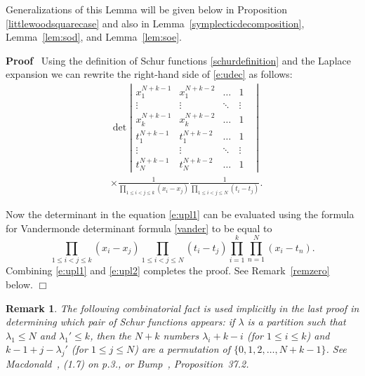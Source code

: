 \documentclass[11pt]{amsart}
\renewenvironment{proof}{
\noindent\textbf{Proof}\ }{\hspace*{\fill}
\begin{math}\Box\end{math}\medskip}
\newtheorem{varremark}{Remark}
\newenvironment{remark}{\begin{varremark}\em}{\em\end{varremark}}
\begin{document}
Generalizations of this Lemma will be given below in Proposition
\ref{littlewoodsquarecase} and also in
Lemma~\ref{symplecticdecomposition}, Lemma~\ref{lem:sod}, and
Lemma~\ref{lem:soe}.

\medbreak
\begin{proof}
Using the definition of Schur functions \eqref{schurdefinition}
and the Laplace expansion we can rewrite the right-hand side of
\eqref{e:udec} as follows:
\begin{equation} \label{e:upl1}
\begin{aligned}
&\det \left|
  \begin{array}{ccccc}
  x_1^{N+k-1}&   x_1^{N+k-2} &
\dots & 1& \\
    \vdots & \vdots &\ddots & \vdots & \\
x_k^{N+k-1} &   x_k^{N+k-2}&
\dots &  1 & \\
t_1^{N+k-1} &   t_1^{N+k-2}&
\dots & 1& \\
    \vdots & \vdots &\ddots & \vdots & \\
t_N^{N+k-1} &   t_N^{N+k-2} & \dots & 1
\end{array} \right|  \\
&\times  \frac {1}{\prod_{1 \leqslant i<j \leqslant k}(x_i-x_j)}
\frac {1}{\prod_{1 \leqslant i<j \leqslant N}(t_i-t_j)}.
\end{aligned}
\end{equation}

Now the determinant in the equation \eqref{e:upl1} can be
evaluated using the formula for Vandermonde determinant formula
\eqref{vander} to be equal to
\begin{equation} \label{e:upl2}
\prod_{1 \leqslant i<j \leqslant k}(x_i-x_j)\prod_{1 \leqslant i<j
\le N}(t_i-t_j)\prod_{i = 1}^k \prod_{n = 1}^N ( x_i  - t_n).
\end{equation}
Combining \eqref{e:upl1} and \eqref{e:upl2} completes the proof.
See Remark~\ref{remzero} below.
\end{proof}

\begin{remark}\label{remzero}
The following combinatorial fact is used implicitly in the last
proof in determining which pair of Schur functions appears: if
$\lambda$ is a partition such that $\lambda_1 \leqslant N$ and
$\lambda_{1}' \leqslant k$, then the $N+k$ numbers $\lambda_i+k-i$
(for $1 \leqslant i \leqslant k$) and $k-1+j-\lambda_{j}'$ (for
$1\leqslant j\leqslant N$) are a permutation of $\{0, 1, 2, \dots,
N+k-1 \}$. See  Macdonald~\cite{Mac}, (1.7) on p.3., or
Bump~\cite{DB}, Proposition~37.2.
\end{remark}
\end{document}
